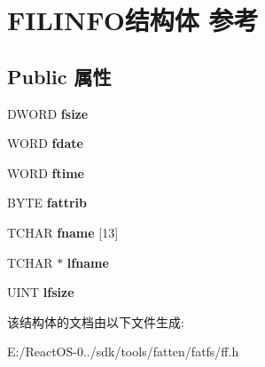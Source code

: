 \hypertarget{struct_f_i_l_i_n_f_o}{}\section{F\+I\+L\+I\+N\+F\+O结构体 参考}
\label{struct_f_i_l_i_n_f_o}
\subsection*{Public 属性}
\begin{DoxyCompactItemize}
\item 
\mbox{\label{struct_f_i_l_i_n_f_o_aee7441af7dc0c443d1e1e6011cc7dcac}} 
D\+W\+O\+RD {\bfseries fsize}
\item 
\mbox{\label{struct_f_i_l_i_n_f_o_a7c01c48a15b1b49da459924437b0bd52}} 
W\+O\+RD {\bfseries fdate}
\item 
\mbox{\label{struct_f_i_l_i_n_f_o_ae0f751b79621bf7b29669f177bbe6b9a}} 
W\+O\+RD {\bfseries ftime}
\item 
\mbox{\label{struct_f_i_l_i_n_f_o_a838d542585831b085537b363f18205c0}} 
B\+Y\+TE {\bfseries fattrib}
\item 
\mbox{\label{struct_f_i_l_i_n_f_o_abd852510f2f79b4ec773156d8942dc7c}} 
T\+C\+H\+AR {\bfseries fname} \mbox{[}13\mbox{]}
\item 
\mbox{\label{struct_f_i_l_i_n_f_o_ac4506c29e0219130dff46b01a1b5c023}} 
T\+C\+H\+AR $\ast$ {\bfseries lfname}
\item 
\mbox{\label{struct_f_i_l_i_n_f_o_a2527c511ff4d12d285dbf3c4b3c9fb7b}} 
U\+I\+NT {\bfseries lfsize}
\end{DoxyCompactItemize}


该结构体的文档由以下文件生成\+:\begin{DoxyCompactItemize}
\item 
E\+:/\+React\+O\+S-\/0../sdk/tools/fatten/fatfs/ff.\+h\end{DoxyCompactItemize}
